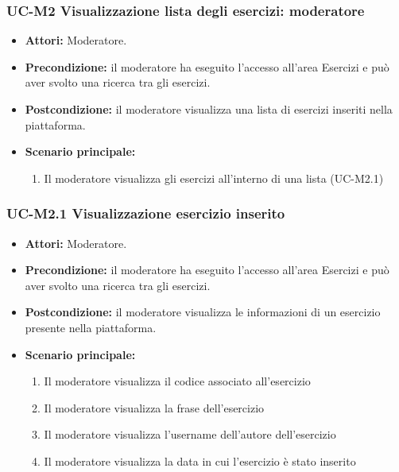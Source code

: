 \subsubsection{UC-M2 Visualizzazione lista degli esercizi: moderatore}
	\begin{itemize}
		\item \textbf{Attori:} Moderatore.
		\item \textbf{Precondizione:} il moderatore ha eseguito l'accesso all'area Esercizi e può aver svolto una ricerca tra gli esercizi.
		\item \textbf{Postcondizione:} il moderatore visualizza una lista di esercizi inseriti nella piattaforma.
		\item \textbf{Scenario principale:}
			\begin{enumerate}
				\item Il moderatore visualizza gli esercizi all'interno di una lista (UC-M2.1)
			\end{enumerate}
	\end{itemize}
		
\subsubsection{UC-M2.1 Visualizzazione esercizio inserito}
	\begin{itemize}
		\item \textbf{Attori:} Moderatore.
		\item \textbf{Precondizione:} il moderatore ha eseguito l'accesso all'area Esercizi e può aver svolto una ricerca tra gli esercizi.
		\item \textbf{Postcondizione:} il moderatore visualizza le informazioni di un esercizio presente nella piattaforma.
		\item \textbf{Scenario principale:}
			\begin{enumerate}
				\item Il moderatore visualizza il codice associato all'esercizio
				\item Il moderatore visualizza la frase dell'esercizio
				\item Il moderatore visualizza l'username dell'autore dell'esercizio
				\item Il moderatore visualizza la data in cui l'esercizio è stato inserito
			\end{enumerate}
	\end{itemize}		
		
